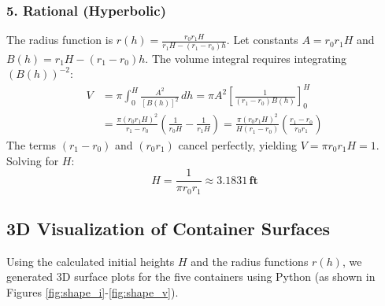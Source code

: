 \documentclass[a4paper, 12pt]{article}
\begin{document}
\subsubsection*{5. Rational (Hyperbolic)}
The radius function is $r(h) = \frac{r_0 r_1 H}{r_1 H - (r_1 - r_0)h}$. Let constants $A = r_0 r_1 H$ and $B(h) = r_1 H - (r_1 - r_0)h$.
The volume integral requires integrating $(B(h))^{-2}$:
\begin{align}
    V &= \pi \int_0^H \frac{A^2}{[B(h)]^2} \, dh = \pi A^2 \left[ \frac{1}{(r_1 - r_0)B(h)} \right]_0^H \\
    &= \frac{\pi (r_0 r_1 H)^2}{r_1 - r_0} \left( \frac{1}{r_0 H} - \frac{1}{r_1 H} \right) = \frac{\pi (r_0 r_1 H)^2}{H(r_1 - r_0)} \left( \frac{r_1 - r_0}{r_0 r_1} \right)
\end{align}
The terms $(r_1 - r_0)$ and $(r_0 r_1)$ cancel perfectly, yielding $V = \pi r_0 r_1 H = 1$.
Solving for $H$:
\begin{equation}
    H = \frac{1}{\pi r_0 r_1} \approx \mathbf{3.1831 \, \text{ft}}
\end{equation}





\subsection{3D Visualization of Container Surfaces}
Using the calculated initial heights $H$ and the radius functions $r(h)$, we generated 3D surface plots for the five containers using Python (as shown in Figures \ref{fig:shape_i}-\ref{fig:shape_v}).
\end{document}
